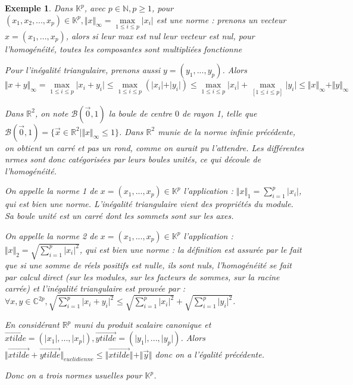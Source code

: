 \documentclass[a4paper,12pt]{book}
\newtheorem{Exe}{Exemple}[section]
\def\R{\mathbb{R}}
\def\C{\mathbb{C}}
\def\N{\mathbb{N}}
\def\K{\mathbb{K}}
\begin{document}
\begin{Exe}
Dans $\K^p$, avec $p\in\N, p\geq 1$, pour $(x_1,x_2,..., x_p)\in\K^p, \Vert x\Vert_{\infty} = \max\limits_{1\leq i\leq p} \vert x_i\vert$ est une norme : prenons un vecteur $x = (x_1,..., x_p)$, alors si leur max est nul leur vecteur est nul, pour l'homogénéité, toutes les composantes sont multipliées fonctionne
\par Pour l'inégalité triangulaire, prenons aussi $y= (y_1,..., y_p)$. Alors $\Vert x+y\Vert_\infty =\max\limits_{1\leq i\leq p} \vert x_i+y_i\vert\leq\max\limits_{1\leq i\leq p}(\vert x_i\vert +\vert y_i\vert)\leq\max\limits_{1\leq i\leq p}\vert x_i\vert + \max\limits_[1\leq i\leq p]\vert y_i\vert \leq \Vert x\Vert_\infty + \Vert y\Vert_\infty$
\par Dans $\R^2$, on note $\mathcal{B}(\vec{0}, 1)$ la boule de centre $0$ de rayon 1, telle que $\mathcal{B}(\vec{0}, 1) =\{\vec{x}\in\R^2\vert \Vert x\Vert_\infty\leq 1\}$. Dans $\R^2$ munie de la norme infinie précédente, on obtient un carré et pas un rond, comme on aurait pu l'attendre. Les différentes nrmes sont donc catégorisées par leurs boules unités, ce qui découle de l'homogénéité.
\par On appelle la norme 1 de $x = (x_1,...,x_p)\in\K^p$ l'application : $\Vert x\Vert_1 = \sum\limits_{i=1}^p \vert x_i\vert$, qui est bien une norme. L'inégalité triangulaire vient des propriétés du module. Sa boule unité est un carré dont les sommets sont sur les axes.
\par On appelle la norme 2 de $x = (x_1,...,x_p)\in\K^p$ l'application : $\Vert x\Vert_2 = \sqrt{\sum\limits_{i=1}^p \vert x_i\vert^2}$, qui est bien une norme : la définition est assurée par le fait que si une somme de réels positifs est nulle, ils sont nuls, l'homogénéité se fait par calcul direct (sur les modules, sur les facteurs de sommes, sur la racine carrée) et l'inégalité triangulaire est prouvée par : $\forall x,y\in\C^{2p},\sqrt{\sum\limits_{i=1}^p\vert x_i+y_i\vert^2} \leq \sqrt{\sum\limits_{i=1}^p\vert  x_i\vert^2}+\sqrt{\sum\limits_{i=1}^p\vert y_i\vert^2}$.
\par En considérant $\R^p$ muni du produit scalaire canonique et $\vec{xtilde} = (\vert x_1\vert,..., \vert x_p\vert), \vec{ytilde}=(\vert y_1\vert,...,\vert y_p\vert)$. Alors $\Vert \vec{xtilde}+\vec{ytilde}\Vert_{euclidienne}\leq \Vert\vec{xtilde}\Vert + \Vert\vec{y}\Vert$ donc on a l'égalité précédente.
\par Donc on a trois normes usuelles pour $\K^p$.
\end{Exe}
\end{document}
